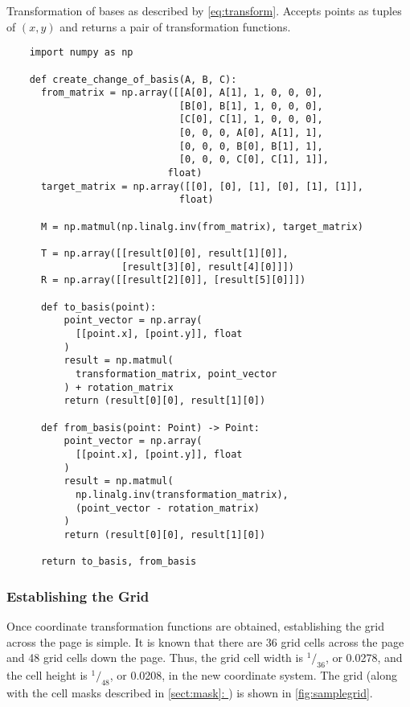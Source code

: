 \documentclass[12pt, letterpaper]{report}
\newcommand*{\sectref}[1]{\hyperref[{#1}]{\ref*{#1}: \nameref*{#1}}}
\newcommand*{\itemref}[1]{\hyperref[{#1}]{\autoref*{#1}}}
\begin{document}
\begin{codesample}[!htbp]
  \caption{Transformation of bases as described by \itemref{eq:transform}. Accepts points as tuples of $(x,y)$ and returns a pair of transformation functions.}
  \label{code:transform}
  \begin{verbatim}
    import numpy as np

    def create_change_of_basis(A, B, C):
      from_matrix = np.array([[A[0], A[1], 1, 0, 0, 0],
                              [B[0], B[1], 1, 0, 0, 0],
                              [C[0], C[1], 1, 0, 0, 0],
                              [0, 0, 0, A[0], A[1], 1],
                              [0, 0, 0, B[0], B[1], 1],
                              [0, 0, 0, C[0], C[1], 1]],
                            float)
      target_matrix = np.array([[0], [0], [1], [0], [1], [1]],
                              float)

      M = np.matmul(np.linalg.inv(from_matrix), target_matrix)

      T = np.array([[result[0][0], result[1][0]],
                    [result[3][0], result[4][0]]])
      R = np.array([[result[2][0]], [result[5][0]]])

      def to_basis(point):
          point_vector = np.array(
            [[point.x], [point.y]], float
          )
          result = np.matmul(
            transformation_matrix, point_vector
          ) + rotation_matrix
          return (result[0][0], result[1][0])

      def from_basis(point: Point) -> Point:
          point_vector = np.array(
            [[point.x], [point.y]], float
          )
          result = np.matmul(
            np.linalg.inv(transformation_matrix),
            (point_vector - rotation_matrix)
          )
          return (result[0][0], result[1][0])

      return to_basis, from_basis
  \end{verbatim}
\end{codesample}

\subsubsection{Establishing the Grid}
Once coordinate transformation functions are obtained, establishing the grid
across the page is simple. It is known that there are 36 grid cells across the
page and 48 grid cells down the page. Thus, the grid cell width is $^1/_{36}$, or
0.0278, and the cell height is $^1/_{48}$, or 0.0208, in the new coordinate
system. The grid (along with the cell masks
described in \sectref{sect:mask}) is shown in \itemref{fig:samplegrid}.
\end{document}
